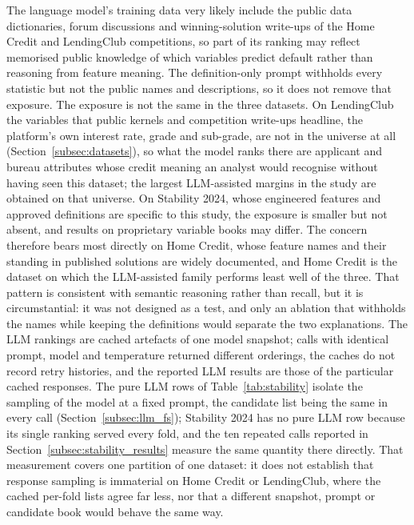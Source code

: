 \documentclass[final,5p,twocolumn]{elsarticle}
\begin{document}
The language model's training data very likely include the public data dictionaries, forum discussions and winning-solution write-ups of the Home Credit and LendingClub competitions, so part of its ranking may reflect memorised public knowledge of which variables predict default rather than reasoning from feature meaning. The definition-only prompt withholds every statistic but not the public names and descriptions, so it does not remove that exposure. The exposure is not the same in the three datasets. On LendingClub the variables that public kernels and competition write-ups headline, the platform's own interest rate, grade and sub-grade, are not in the universe at all (Section~\ref{subsec:datasets}), so what the model ranks there are applicant and bureau attributes whose credit meaning an analyst would recognise without having seen this dataset; the largest LLM-assisted margins in the study are obtained on that universe. On Stability 2024, whose engineered features and approved definitions are specific to this study, the exposure is smaller but not absent, and results on proprietary variable books may differ. The concern therefore bears most directly on Home Credit, whose feature names and their standing in published solutions are widely documented, and Home Credit is the dataset on which the LLM-assisted family performs least well of the three. That pattern is consistent with semantic reasoning rather than recall, but it is circumstantial: it was not designed as a test, and only an ablation that withholds the names while keeping the definitions would separate the two explanations. The LLM rankings are cached artefacts of one model snapshot; calls with identical prompt, model and temperature returned different orderings, the caches do not record retry histories, and the reported LLM results are those of the particular cached responses. The pure LLM rows of Table~\ref{tab:stability} isolate the sampling of the model at a fixed prompt, the candidate list being the same in every call (Section~\ref{subsec:llm_fs}); Stability 2024 has no pure LLM row because its single ranking served every fold, and the ten repeated calls reported in Section~\ref{subsec:stability_results} measure the same quantity there directly. That measurement covers one partition of one dataset: it does not establish that response sampling is immaterial on Home Credit or LendingClub, where the cached per-fold lists agree far less, nor that a different snapshot, prompt or candidate book would behave the same way.
\end{document}

